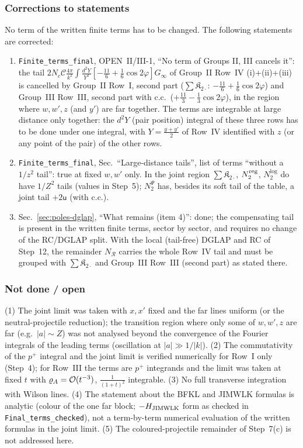 \documentclass[10pt]{article}
\begin{document}
\subsubsection{Corrections to statements}\label{ft:corr}
\noindent No term of the written finite terms has to be changed. The following statements are corrected:
\begin{enumerate}
\item {\color{red}\texttt{Finite\_terms\_final}, OPEN~II/III-1, ``No term of Groups II, III cancels it'': the tail $2N_{c}\mathcal{C}\frac{4\pi}{k^{2}}\int\frac{d^{2}Y}{Y^{2}}[-\frac{11}{6}+\frac16\cos2\varphi]G_{\infty}$ of Group~II Row~IV (i)+(ii)+(iii) is cancelled by Group~II Row~I, second part ($\sum\mathfrak{K}_{2\cdot}$: $-\frac{11}{6}+\frac16\cos2\varphi$) and Group~III Row~III, second part with c.c.\ ($+\frac{11}{3}-\frac13\cos2\varphi$), in the region where $w,w',z$ (and $y'$) are far together. The terms are integrable at large distance only together: the $d^{2}Y$ (pair position) integral of these three rows has to be done under one integral, with $Y=\frac{y+y'}{2}$ of Row~IV identified with $z$ (or any point of the pair) of the other rows.}
\item {\color{red}\texttt{Finite\_terms\_final}, Sec.~``Large-distance tails'', list of terms ``without a $1/z^{2}$ tail'': true at fixed $w,w'$ only. In the joint region $\sum\mathfrak{K}_{2\cdot}$, $N_{2}^{\rm reg}$, $N_{2}^{\log}$ do have $1/Z^{2}$ tails (values in Step~5); $N_{2}^{\Psi}$ has, besides its soft tail of the table, a joint tail $+2\mathsf{u}$ (with c.c.).}
\item {\color{red}Sec.~\ref{sec:poles-dglap}, ``What remains (item 4)'': done; the compensating tail is present in the written finite terms, sector by sector, and requires no change of the RC/DGLAP split. With the local (tail-free) DGLAP and RC of Step~12, the remainder $N_{\mathcal{R}}$ carries the whole Row~IV tail and must be grouped with $\sum\mathfrak{K}_{2\cdot}$ and Group~III Row~III (second part) as stated there.}
\end{enumerate}

\subsubsection{Not done / open}
\noindent (1) The joint limit was taken with $x,x'$ fixed and the far lines uniform (or the neutral-projectile reduction); the transition region where only some of $w,w',z$ are far (e.g.\ $|a|\sim Z$) was not analysed beyond the convergence of the Fourier integrals of the leading terms (oscillation at $|a|\gg1/|k|$). (2) The commutativity of the $p^{+}$ integral and the joint limit is verified numerically for Row~I only (Step~4); for Row~III the terms are $p^{+}$ integrands and the limit was taken at fixed $t$ with $\varrho_{A}={\cal O}(t^{-3})$, $\frac{1}{(1+t)^{2}}$ integrable. (3) No full transverse integration with Wilson lines. (4) The statement about the BFKL and JIMWLK formulas is analytic (colour of the one far block; $-H_{\rm JIMWLK}$ form as checked in \texttt{Final\_terms\_checked}), not a term-by-term numerical evaluation of the written formulas in the joint limit. (5) The coloured-projectile remainder of Step~7(c) is not addressed here.
\end{document}
